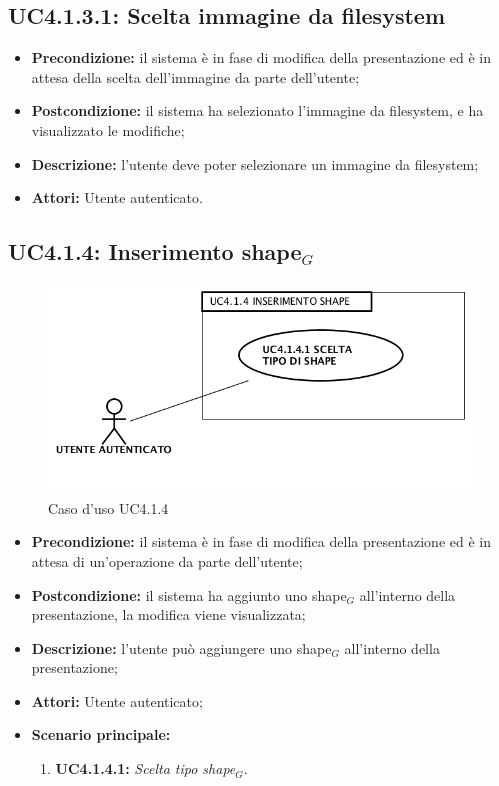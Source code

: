 \subsection{ UC4.1.3.1: Scelta immagine da filesystem}

\begin{itemize}
	\item \textbf{Precondizione:} il sistema è in fase di modifica della presentazione ed è in attesa della scelta dell'immagine da parte dell'utente;
	\item \textbf{Postcondizione:} il sistema ha selezionato l'immagine da filesystem, e ha visualizzato le modifiche;
	\item \textbf{Descrizione:} l'utente deve poter selezionare un immagine da filesystem;
	\item \textbf{Attori:} Utente autenticato.
\end{itemize}
\subsection{ UC4.1.4: Inserimento shape$_G$}

\begin{figure}[H]
	\begin{center}
	\includegraphics[scale=0.4]{diagram/UC4-1-4.png}
	\caption{Caso d'uso UC4.1.4}
	\end{center}
\end{figure}
\begin{itemize}
	\item \textbf{Precondizione:} il sistema è in fase di modifica della presentazione ed è in attesa di un'operazione da parte dell'utente;
	\item \textbf{Postcondizione:} il sistema ha aggiunto uno shape$_G$ all'interno della presentazione, la modifica viene visualizzata;
	\item \textbf{Descrizione:} l'utente può aggiungere uno shape$_G$ all'interno della presentazione;
	\item \textbf{Attori:} Utente autenticato;
	\item \textbf{Scenario principale:}
	\begin{enumerate}
		\item \textbf{ UC4.1.4.1:} \textit{ Scelta tipo shape$_G$}.
	\end{enumerate}
\end{itemize}
